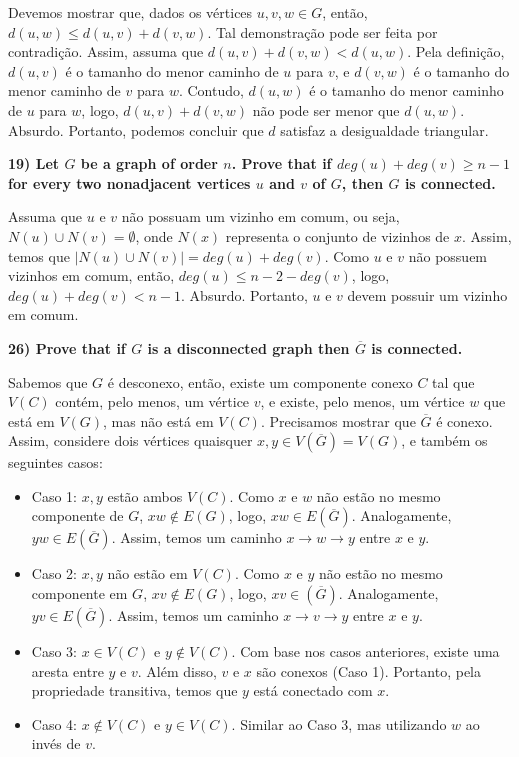 \documentclass[]{article}
\begin{document}
Devemos mostrar que, dados os vértices $u, v, w \in G$, então, $d(u, w) \leq d(u, v) + d(v, w)$. Tal demonstração pode ser feita por contradição. Assim, assuma que $d(u, v) + d(v, w) < d(u, w)$. Pela definição, $d(u, v)$ é o tamanho do menor caminho de $u$ para $v$, e $d(v, w)$ é o tamanho do menor caminho de $v$ para $w$. Contudo, $d(u, w)$ é o tamanho do menor caminho de $u$ para $w$, logo, $d(u, v) + d(v, w)$ não pode ser menor que $d(u, w)$. Absurdo. Portanto, podemos concluir que $d$ satisfaz a desigualdade triangular.

\newpage

\noindent \textbf{19) Let $G$ be a graph of order $n$. Prove that if $deg(u) + deg(v) \geq n-1$ for every two nonadjacent vertices $u$ and $v$ of $G$, then $G$ is connected.}

Assuma que $u$ e $v$ não possuam um vizinho em comum, ou seja, $N(u) \cup N(v) = \emptyset$, onde $N(x)$ representa o conjunto de vizinhos de $x$. Assim, temos que $|N(u) \cup N(v)| = deg(u) + deg(v)$. Como $u$ e $v$ não possuem vizinhos em comum, então, $deg(u) \leq n-2 - deg(v)$, logo, $deg(u) + deg(v) < n-1$. Absurdo. Portanto, $u$ e $v$ devem possuir um vizinho em comum.

\newpage

\noindent \textbf{26) Prove that if $G$ is a disconnected graph then $\overline{G}$ is connected.}

Sabemos que $G$ é desconexo, então, existe um componente conexo $C$ tal que $V(C)$ contém, pelo menos, um vértice $v$, e existe, pelo menos, um vértice $w$ que está em $V(G)$, mas não está em $V(C)$. Precisamos mostrar que $\overline{G}$ é conexo. Assim, considere dois vértices quaisquer $x, y \in V(\overline{G}) = V(G)$, e também os seguintes casos:

\begin{itemize}
    \item Caso 1: $x, y$ estão ambos $V(C)$. Como $x$ e $w$ não estão no mesmo componente de $G$, $xw \notin E(G)$, logo, $xw \in E(\overline{G})$. Analogamente, $yw \in E(\overline{G})$. Assim, temos um caminho $x \rightarrow w \rightarrow y$ entre $x$ e $y$. 
    
    \item Caso 2: $x, y$ não estão em $V(C)$. Como $x$ e $y$ não estão no mesmo componente em $G$, $xv \notin E(G)$, logo, $xv \in (\overline{G})$. Analogamente, $yv \in E(\overline{G})$. Assim, temos um caminho $x \rightarrow v \rightarrow y$ entre $x$ e $y$.
    
    \item Caso 3: $x \in V(C)$ e $y \notin V(C)$. Com base nos casos anteriores, existe uma aresta entre $y$ e $v$. Além disso, $v$ e $x$ são conexos (Caso 1). Portanto, pela propriedade transitiva, temos que $y$ está conectado com $x$.
    
    \item Caso 4: $x \notin V(C)$ e $y \in V(C)$. Similar ao Caso 3, mas utilizando $w$ ao invés de $v$.
\end{itemize}
\end{document}
